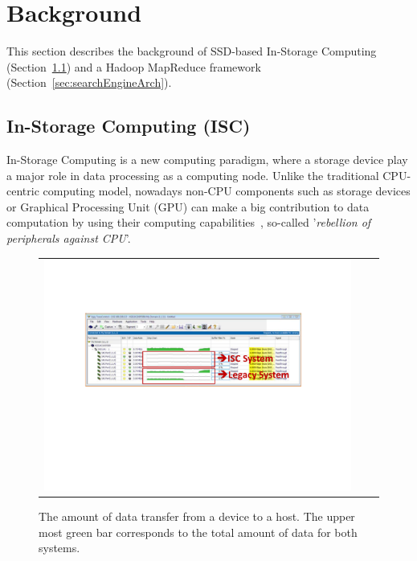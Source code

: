 

\section{Background}\label{sec:background}

This section describes the background of SSD-based In-Storage Computing (Section~\ref{sec:ISC_background}) and a Hadoop MapReduce framework (Section~\ref{sec:searchEngineArch}).

\subsection{In-Storage Computing (ISC)}\label{sec:ISC_background}
In-Storage Computing is a new computing paradigm, where a storage device play a major role in data processing as a computing node. Unlike the traditional CPU-centric computing model, nowadays non-CPU components such as storage devices or Graphical Processing Unit (GPU) can make a big contribution to data computation by using their computing capabilities~\cite{ActivFlash:FAST:2013,CUDA:Tutorial:2012,SmartSSD:SIGMOD:2013}, so-called '\emph{rebellion of peripherals against CPU}'.


\begin{figure}[htbp]
  \centering
  \begin{tabular}{ccc}
\includegraphics[width=0.99\columnwidth]{figures/Bus_Analyzer.pdf}
\end{tabular}
  \caption{The amount of data transfer from a device to a host. The upper most green bar corresponds to the total amount of data for both systems.}
  \label{fig:Bus_Alanyzer}
 \end{figure}


